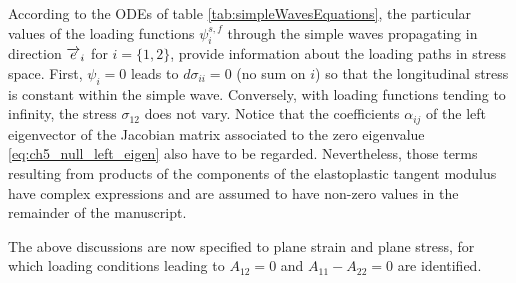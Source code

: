 According to the ODEs of table \ref{tab:simpleWavesEquations}, the particular values of the loading functions $\psi_i^{s,f}$ through the simple waves propagating in direction ${\overrightarrow{e}}_i$ for $i=\{1,2\}$, provide information about the loading paths in stress space.
First, $\psi_i =0$ leads to $d\sigma_{ii}=0$ (no sum on $i$) so that the longitudinal stress is constant within the simple wave.
Conversely, with loading functions tending to infinity, the stress $\sigma_{12}$ does not vary.
Notice that the coefficients $\alpha_{ij}$ of the left eigenvector of the Jacobian matrix associated to the zero eigenvalue \eqref{eq:ch5_null_left_eigen} also have to be regarded.
Nevertheless, those terms resulting from products of the components of the elastoplastic tangent modulus have complex expressions and are assumed to have non-zero values in the remainder of the manuscript.

The above discussions are now specified to plane strain and plane stress, for which loading conditions leading to $A_{12} =0$ and $A _{11}-A _{22}=0$ are identified.



